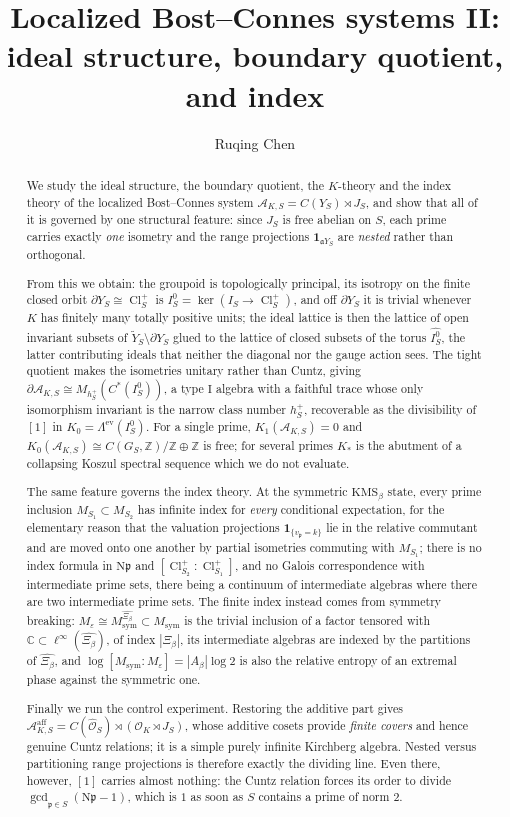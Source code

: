 \documentclass[11pt]{amsart}
\title[Ideals, boundary, and index]{Localized Bost--Connes systems II:\\ ideal structure, boundary quotient, and index}
\author{Ruqing Chen}
\date{}
\numberwithin{equation}{section}
\theoremstyle{definition}
\theoremstyle{remark}
\newcommand{\Z}{\mathbb{Z}}
\newcommand{\C}{\mathbb{C}}
\newcommand{\cA}{\mathcal{A}}
\newcommand{\cO}{\mathcal{O}}
\newcommand{\hO}{\widehat{\cO}}
\newcommand{\pp}{\mathfrak{p}}
\newcommand{\aaa}{\mathfrak{a}}
\newcommand{\Ns}{\mathrm{N}}
\newcommand{\Cl}{\operatorname{Cl}}
\newcommand{\Msym}{M_{\mathrm{sym}}}
\begin{document}
\begin{abstract}
We study the ideal structure, the boundary quotient, the $K$-theory and the index theory
of the localized Bost--Connes system $\cA_{K,S}=C(Y_S)\rtimes J_S$, and show that all of it
is governed by one structural feature: since $J_S$ is free abelian on $S$, each prime
carries exactly \emph{one} isometry and the range projections
$\mathbf 1_{\aaa Y_S}$ are \emph{nested} rather than orthogonal.

From this we obtain: the groupoid is topologically principal, its isotropy on the finite
closed orbit $\partial Y_S\cong\Cl^+_S$ is $I_S^0=\ker(I_S\to\Cl^+_S)$, and off
$\partial Y_S$ it is trivial whenever $K$ has finitely many totally positive units; the ideal
lattice is then the lattice of open invariant subsets of $\widetilde Y_S\setminus\partial Y_S$
glued to the lattice of closed subsets of the torus $\widehat{I_S^0}$, the latter
contributing ideals that neither the diagonal nor the gauge action sees. The tight quotient
makes the isometries unitary rather than Cuntz, giving
$\partial\cA_{K,S}\cong M_{h^+_S}(C^*(I_S^0))$, a type $\mathrm I$ algebra with a faithful
trace whose only isomorphism invariant is the narrow class number $h^+_S$, recoverable as
the divisibility of $[1]$ in $K_0=\Lambda^{\mathrm{ev}}(I_S^0)$. For a single prime,
$K_1(\cA_{K,S})=0$ and $K_0(\cA_{K,S})\cong C(G_S,\Z)/\Z\oplus\Z$ is free; for several primes
$K_*$ is the abutment of a collapsing Koszul spectral sequence which we do not evaluate.

The same feature governs the index theory. At the symmetric $\mathrm{KMS}_\beta$ state, every
prime inclusion $M_{S_1}\subset M_{S_2}$ has infinite index for \emph{every} conditional
expectation, for the elementary reason that the valuation projections $\mathbf 1_{\{v_\pp=k\}}$
lie in the relative commutant and are moved onto one another by partial isometries commuting
with $M_{S_1}$; there is no index formula in $\Ns\pp$ and $[\Cl^+_{S_2}:\Cl^+_{S_1}]$, and no
Galois correspondence with intermediate prime sets, there being a continuum of intermediate
algebras where there are two intermediate prime sets. The finite index instead comes from
symmetry breaking: $M_\varepsilon\cong\Msym^{\widehat{\Xi_\beta}}\subset\Msym$ is the trivial
inclusion of a factor tensored with $\C\subset\ell^\infty(\widehat{\Xi_\beta})$, of index
$|\Xi_\beta|$, its intermediate algebras are indexed by the partitions of
$\widehat{\Xi_\beta}$, and $\log[\Msym:M_\varepsilon]=|A_\beta|\log2$ is also the relative
entropy of an extremal phase against the symmetric one.

Finally we run the control experiment. Restoring the additive part gives
$\cA^{\mathrm{aff}}_{K,S}=C(\hO_S)\rtimes(\cO_K\rtimes J_S)$, whose additive cosets provide
\emph{finite covers} and hence genuine Cuntz relations; it is a simple purely infinite
Kirchberg algebra. Nested versus partitioning range projections is therefore
exactly the dividing line. Even there, however, $[1]$ carries almost nothing: the Cuntz
relation forces its order to divide $\gcd_{\pp\in S}(\Ns\pp-1)$, which is $1$ as soon as
$S$ contains a prime of norm $2$.
\end{abstract}
\end{document}
